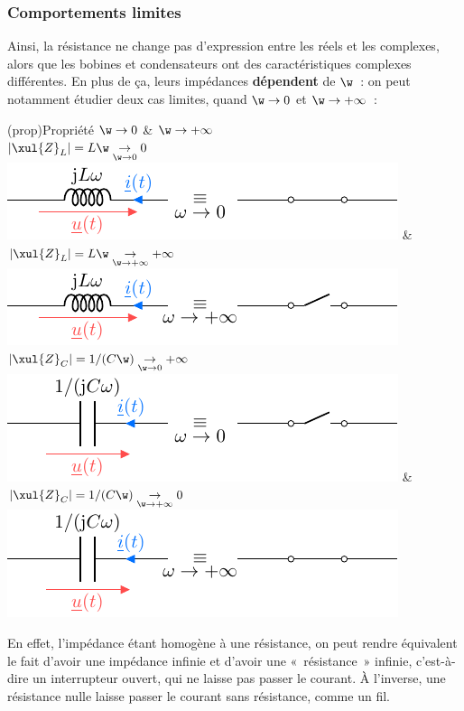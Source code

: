 \documentclass[../../main/main.tex]{subfiles}
\begin{document}
\subsubsection{Comportements limites}
Ainsi, la résistance ne change pas d'expression entre les réels et les
complexes, alors que les bobines et condensateurs ont des caractéristiques
complexes différentes. En plus de ça, leurs impédances \textbf{dépendent} de
$\w$~: on peut notamment étudier deux cas limites, quand $\w\rightarrow0$ et
$\w\rightarrow+\infty$~:
\begin{tcb}[tabularx*={\renewcommand{\arraystretch}{1.5}}{Y|Y}, hand](prop){Propriété}
	$\w\rightarrow0$ &
	$\w\rightarrow+\infty$
	\\\hline
	$|\xul{Z}_L| = L\w
		\underset{\w\rightarrow0}{\rightarrow}0$
	\smallbreak
	\includegraphics[width=\linewidth]{zlwa} &
	$|\xul{Z}_L| = L\w
		\underset{\w\rightarrow+\infty}{\rightarrow}+\infty$
	\smallbreak
	\includegraphics[width=\linewidth]{zlwi}
	\\\hline
	$|\xul{Z}_C| = 1/(C\w)
		\underset{\w\rightarrow0}{\rightarrow}+\infty$
	\smallbreak
	\includegraphics[width=\linewidth]{zcwa} &
	$|\xul{Z}_C| = 1/(C\w)
		\underset{\w\rightarrow+\infty}{\rightarrow}0$
	\smallbreak
	\includegraphics[width=\linewidth]{zcwi}
\end{tcb}
En effet, l'impédance étant homogène à une résistance, on peut rendre équivalent
le fait d'avoir une impédance infinie et d'avoir une «~résistance~» infinie,
c'est-à-dire un interrupteur ouvert, qui ne laisse pas passer le courant. À
l'inverse, une résistance nulle laisse passer le courant sans résistance, comme
un fil.
\end{document}
